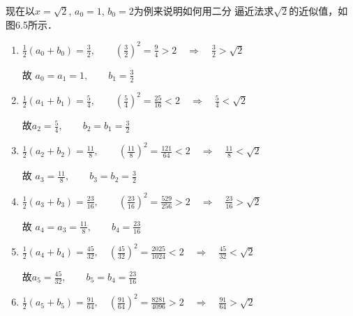 现在以$x=\sqrt{2}$, $a_0=1$, $b_0=2$为例来说明如何用二分
逼近法求$\sqrt{2}$的近似值，如图6.5所示．
\begin{figure}[htp]
    \centering
{}
    \caption{}
\end{figure}

\begin{enumerate}
    \item  $\frac{1}{2}\left(a_{0}+b_{0}\right)=\frac{3}{2},\qquad \left(\frac{3}{2}\right)^{2}=\frac{9}{4}>2 \quad\Rightarrow\quad\frac{3}{2}>\sqrt{2}$
    
    故 $a_{0}=a_{1}=1,\qquad   b_{1}=\frac{3}{2}$

    \item   $\frac{1}{2}\left(a_{1}+b_{1}\right)=\frac{5}{4},\qquad \left(\frac{5}{4}\right)^{2}=\frac{25}{16}<2 \quad\Rightarrow\quad \frac{5}{4}<\sqrt{2}$
    
    故$a_{2}=\frac{5}{4}, \qquad  b_{2}=b_{1}=\frac{3}{2}$

    \item  $\frac{1}{2}\left(a_{2}+b_{2}\right)=\frac{11}{8},\qquad \left(\frac{11}{8}\right)^{2}=\frac{121}{64}<2 \quad\Rightarrow\quad \frac{11}{8}<\sqrt{2}$
    
    故 $a_{3}=\frac{11}{8},\qquad  b_{3}=b_{2}=\frac{3}{2}$

    \item   $\frac{1}{2}\left(a_{3}+b_{3}\right)=\frac{23}{16},\qquad \left(\frac{23}{16}\right)^{2}=\frac{529}{256}>2 \quad\Rightarrow\quad \frac{23}{16}>\sqrt{2}$
    
    故 $a_{4}=a_{3}=\frac{11}{8},\qquad  b_{4}=\frac{23}{16}$

    \item  $\frac{1}{2}\left(a_{4}+b_{4}\right)=\frac{45}{32},\quad \left(\frac{45}{32}\right)^{2}=\frac{2025}{1024}<2 \quad\Rightarrow\quad \frac{45}{32}<\sqrt{2}$
    
     故$a_{5}=\frac{45}{32}, \qquad b_{5}=b_{4}=\frac{23}{16}
    $
    
    \item  $\frac{1}{2}\left(a_{5}+b_{5}\right)=\frac{91}{64},\quad \left(\frac{91}{64}\right)^{2}=\frac{8281}{4096}>2 \quad\Rightarrow\quad \frac{91}{64}>\sqrt{2}$
    

\end{enumerate}
